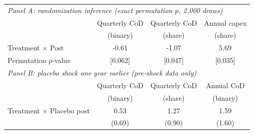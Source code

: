 \begin{tabular}{lccc}
\toprule
\multicolumn{4}{l}{\emph{Panel A: randomization inference (exact permutation $p$, 2,000 draws)}} \\
 & Quarterly CoD & Quarterly CoD & Annual capex \\
 & (binary) & (share) & (share) \\
\midrule
Treatment $\times$ Post & -0.61 & -1.07 & 5.69 \\
Permutation $p$-value & [0.062] & [0.047] & [0.035] \\
\midrule
\multicolumn{4}{l}{\emph{Panel B: placebo shock one year earlier (pre-shock data only)}} \\
 & Quarterly CoD & Quarterly CoD & Annual CoD \\
 & (binary) & (share) & (binary) \\
\midrule
Treatment $\times$ Placebo post & 0.53 & 1.27 & 1.59 \\
 & (0.69) & (0.90) & (1.60) \\
\bottomrule
\end{tabular}